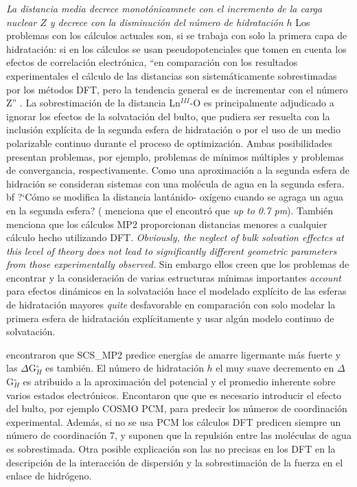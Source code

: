 {\it La distancia media decrece monot\'onicamnete con el incremento
de la carga nuclear $Z$ y decrece con la disminuci\'on del n\'umero 
de hidrataci\'on $h$	}
Los problemas con los c\'alculos actuales son, si se trabaja con solo
la primera capa de hidrataci\'on:
si en los c\'alculos se usan pseudopotenciales que tomen en cuenta 
los efectos de correlaci\'on electr\'onica, ``en comparaci\'on con 
los resultados experimentales el c\'alculo de las distancias son 
sistem\'aticamente sobrestimadas por los m\'etodos DFT, pero la
tendencia general es de incrementar con el n\'umero Z'' 
\citep{ciup2010}. La sobrestimaci\'on de la distancia Ln$^{III}$-O
es principalmente adjudicado a ignorar los efectos de la 
solvataci\'on del bulto, que pudiera ser resuelta con la inclusi\'on
expl\'icita de la segunda esfera de hidrataci\'on  o por el uso de un
medio polarizable continuo durante el proceso de optimizaci\'on. 
Ambas posibilidades presentan problemas, por ejemplo, problemas de 
m\'inimos m\'ultiples y problemas de convergancia, respectivamente. 
Como una aproximaci\'on  a la segunda esfera de hidraci\'on se 
consideran sistemas con una mol\'ecula de agua en la segunda esfera.
{bf ?`C\'omo se modifica la distancia lant\'anido- ox\'igeno cuando
se agraga un agua en la segunda esfera?} (\cite{ciup201001} menciona
que el encontr\'o que {\it up to 0.7 pm}). Tambi\'en menciona que los
c\'alculos MP2 proporcionan distancias menores a cualquier c\'alculo
hecho utilizando DFT. {\it Obviously, the neglect of bulk solvation
effectcs at this level of theory does not lead to significantly 
different geometric parameters from those experimentally observed.}
Sin embargo ellos creen que los problemas de encontrar y la 
consideraci\'on de varias estructuras m\'inimas importantes  
{\it account} para efectos din\'amicos en la solvataci\'on hace el
modelado expl\'icito de las esferas de hidrataci\'on mayores 
{\it quite} desfavorable en comparaci\'on  con solo modelar la
primera esfera de hidrataci\'on expl\'icitamente y usar alg\'un 
modelo continuo de solvataci\'on.

\cite{ciup201001} encontraron que SCS_MP2 predice energ\'ias de 
amarre ligermante m\'as fuerte y las $\Delta$G$^{\circ}_H$ es 
tambi\'en. El n\'umero de hidrataci\'on $h$ el muy suave decremento 
en $\Delta$G$^{\circ}_H$ es atribuido a la aproximaci\'on del 
potencial y el promedio inherente  sobre varios estados 
electr\'onicos. Encontaron que que es necesario introducir el efecto
del bulto, por ejemplo COSMO PCM, para predecir los n\'umeros de
coordinaci\'on experimental. Adem\'as, si no se usa PCM los 
c\'alculos DFT predicen siempre un n\'umero de coordinaci\'on 7, y 
suponen que la repulsi\'on entre las mol\'eculas de agua es 
sobrestimada. Otra posible explicaci\'on son las no precisas en los
DFT en la descripci\'on de la interacci\'on de dispersi\'on y la 
sobrestimaci\'on de la fuerza en el enlace de hidr\'ogeno.

